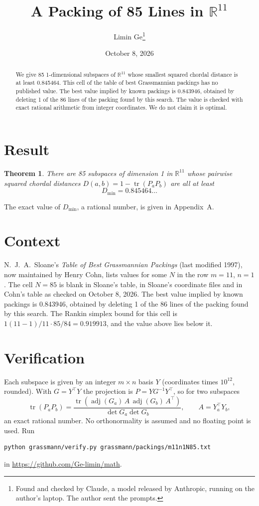 \documentclass[11pt,a4paper]{article}
\title{A Packing of 85 Lines in $\mathbb{R}^{11}$}
\author{Limin Ge\thanks{Found and checked by Claude, a model released by Anthropic, running on the author's laptop. The author sent the prompts.}}
\date{October 8, 2026}
\newtheorem*{theorem}{Theorem}
\begin{document}
\maketitle
\begin{abstract}
We give 85 1-dimensional subspaces of $\mathbb{R}^{11}$ whose smallest squared chordal distance is at least 0.845464. This cell of the table of best Grassmannian packings has no published value. The best value implied by known packings is 0.843946, obtained by deleting 1 of the 86 lines of the packing found by this search. The value is checked with exact rational arithmetic from integer coordinates. We do not claim it is optimal.
\end{abstract}

\section{Result}
\begin{theorem}
There are 85 subspaces of dimension 1 in $\mathbb{R}^{11}$ whose pairwise squared chordal distances $D(a,b) = 1 - \operatorname{tr}(P_aP_b)$ are all at least
\[ D_{\min} = 0.845464\ldots \]
\end{theorem}
The exact value of $D_{\min}$, a rational number, is given in Appendix~A.


\section{Context}
N.~J.~A.~Sloane's \emph{Table of Best Grassmannian Packings} (last modified 1997), now maintained by Henry Cohn, lists values for some $N$ in the row $m=11$, $n=1$. The cell $N=85$ is blank in Sloane's table, in Sloane's coordinate files and in Cohn's table as checked on October 8, 2026. The best value implied by known packings is 0.843946, obtained by deleting 1 of the 86 lines of the packing found by this search. The Rankin simplex bound for this cell is $1(11-1)/11\cdot 85/84 = 0.919913$, and the value above lies below it.


\section{Verification}
Each subspace is given by an integer $m\times n$ basis $Y$ (coordinates times $10^{12}$, rounded). With $G=Y^\top Y$ the projection is $P=YG^{-1}Y^\top$, so for two subspaces
\[ \operatorname{tr}(P_aP_b)=\frac{\operatorname{tr}(\operatorname{adj}(G_a)\,A\,\operatorname{adj}(G_b)\,A^\top)}{\det G_a\det G_b},\qquad A=Y_a^\top Y_b, \]
an exact rational number. No orthonormality is assumed and no floating point is used. Run
\begin{verbatim}
python grassmann/verify.py grassmann/packings/m11n1N85.txt
\end{verbatim}
in \url{https://github.com/Ge-limin/math}.
\end{document}
